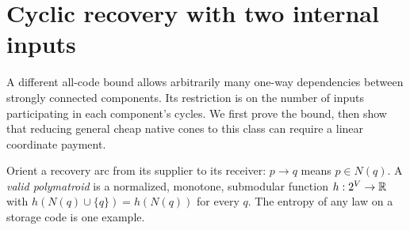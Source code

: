 \section{Cyclic recovery with two internal inputs}\label{sec:cyclic-cores}

A different all-code bound allows arbitrarily many one-way dependencies
between strongly connected components. Its restriction is on the number
of inputs participating in each component's cycles. We first prove the
bound, then show that reducing general cheap native cones to this class
can require a linear coordinate payment.

Orient a recovery arc from its supplier to its receiver: $p\to q$ means
$p\in N(q)$. A \emph{valid polymatroid} is a normalized, monotone,
submodular function $h:2^V\to\mathbb{R}$ with
$h(N(q)\cup\{q\})=h(N(q))$ for every $q$.
The entropy of any law on a storage code is one example.

